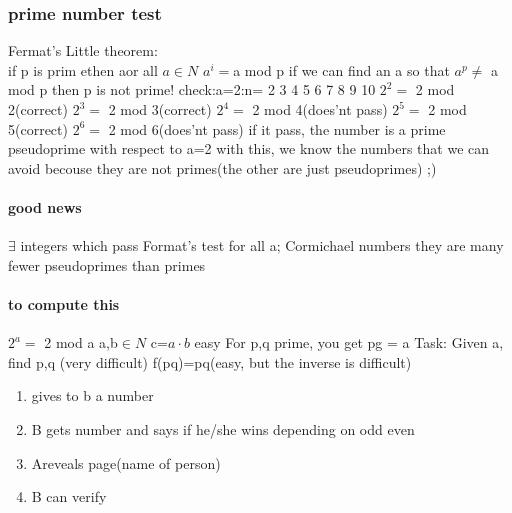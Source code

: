 \documentclass[a4paper,10pt]{article}
\begin{document}
{\subsubsection{prime number test}
Fermat's Little theorem:\\
if p is prim ethen aor all $a\in N$ $a^i=$a mod p
\newline
if we can find an a so that $a^p\neq$ a mod p 
\newline
then p is not prime!
\newline
check:a=2:n= 2 3 4 5 6 7 8 9 10
\newline
$2^2=$ 2 mod 2(correct)
\newline
$2^3=$ 2 mod 3(correct)
\newline
$2^4=$ 2 mod 4(does'nt pass)
\newline
$2^5=$ 2 mod 5(correct)
\newline
$2^6=$ 2 mod 6(does'nt pass)
\newline
if it pass, the number is a prime
\newline
pseudoprime with respect to a=2
\newline
with this, we know the numbers that we can avoid becouse they are not primes(the other are just pseudoprimes) ;)
\paragraph{good news}
$\exists$ integers which pass Format's test for all a; Cormichael numbers
\newline
they are many fewer pseudoprimes than primes
\paragraph{to compute this}
$2^a=$ 2 mod a
\newline
a,b$\in N$
\newline
c=$a\cdot b$ easy
\newline
For p,q prime, you get pg = a
\newline
Task: Given a, find p,q (very difficult)
\newline
f(pq)=pq(easy, but the inverse is difficult)
\begin{enumerate}
 \item gives to b a number
 \item B gets number and says if he/she wins depending on odd even
 \item Areveals page(name of person)
 \item B can verify
\end{enumerate}
}
\end{document}

